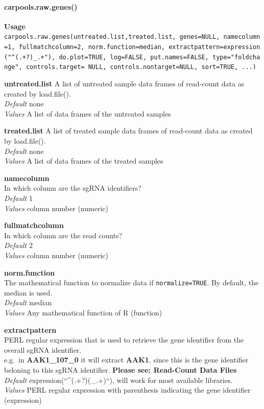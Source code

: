 \documentclass[]{article}
\let\oldparagraph\paragraph
\renewcommand{\paragraph}[1]{\oldparagraph{#1}\mbox{}}
\begin{document}
\paragraph{carpools.raw.genes()}\label{carpools.raw.genes}

\textbf{Usage}
\texttt{carpools.raw.genes(untreated.list,treated.list,\ genes=NULL,\ namecolumn=1,\ fullmatchcolumn=2,\ norm.function=median,\ extractpattern=expression("\^{}(.+?)\_.+"),\ do.plot=TRUE,\ log=FALSE,\ put.names=FALSE,\ type="foldchange",\ controls.target=\ NULL,\ controls.nontarget=NULL,\ sort=TRUE,\ ...)}

\textbf{untreated.list} A list of untreated sample data frames of
read-count data as created by load.file().\\
\emph{Default} none\\
\emph{Values} A list of data frames of the untreated samples

\textbf{treated.list} A list of treated sample data frames of read-count
data as created by load.file().\\
\emph{Default} none\\
\emph{Values} A list of data frames of the treated samples

\textbf{namecolumn}\\
In which column are the sgRNA identifiers?\\
\emph{Default} 1\\
\emph{Values} column number (numeric)

\textbf{fullmatchcolumn}\\
In which column are the read counts?\\
\emph{Default} 2\\
\emph{Values} column number (numeric)

\textbf{norm.function}\\
The mathematical function to normalize data if \texttt{normalize=TRUE}.
By default, the median is used.\\
\emph{Default} median\\
\emph{Values} Any mathematical function of R (function)

\textbf{extractpattern}\\
PERL regular expression that is used to retrieve the gene identifier
from the overall sgRNA identifier.\\
e.g.~in \textbf{AAK1\_107\_0} it will extract \textbf{AAK1}, since this
is the gene identifier beloning to this sgRNA identifier. \textbf{Please
see: Read-Count Data Files}\\
\emph{Default} expression(``\^{}(.+?)(\_.+)``), will work for most
available libraries.\\
\emph{Values} PERL regular expression with parenthesis indicating the
gene identifier (expression)
\end{document}
